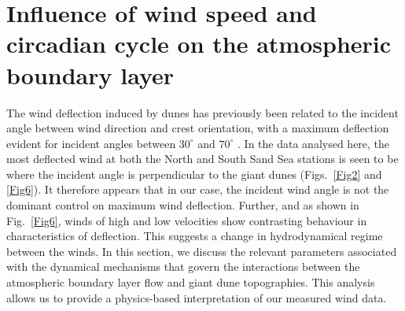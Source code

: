 \section{Influence of wind speed and circadian cycle on the atmospheric boundary layer}
\label{sec:sec3}
The wind deflection induced by dunes has previously been related to the incident angle between wind direction and crest orientation, with a maximum deflection evident for incident angles between $30^{\circ}$ and $70^{\circ}$ \citep{Walker2009, Hesp2015}. In the data analysed here, the most deflected wind at both the North and South Sand Sea stations is seen to be where the incident angle is perpendicular to the giant dunes (Figs.~\ref{Fig2} and \ref{Fig6}). It therefore appears that in our case, the incident wind angle is not the dominant control on maximum wind deflection. Further, and as shown in Fig.~\ref{Fig6}, winds of high and low velocities show contrasting behaviour in characteristics of deflection. This suggests a change in hydrodynamical regime between the winds. In this section, we discuss the relevant parameters associated with the dynamical mechanisms that govern the interactions between the atmospheric boundary layer flow and giant dune topographies. This analysis allows us to provide a physics-based interpretation of our measured wind data.


